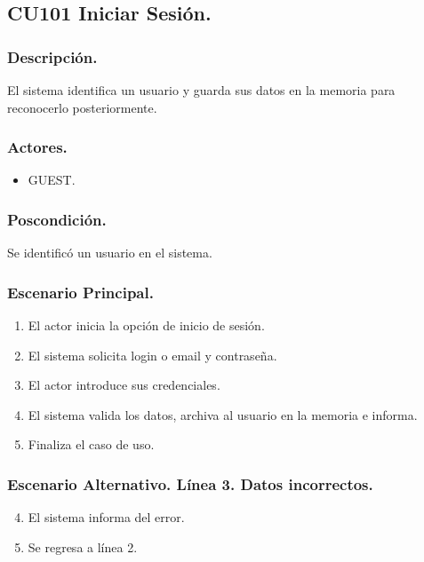 \subsection{CU101 Iniciar Sesi\'{o}n.}
\subsubsection{Descripci\'{o}n.}
El sistema identifica un usuario y guarda sus datos en la memoria para reconocerlo posteriormente.
\subsubsection{Actores.}
\begin{itemize}
\item GUEST.
\end{itemize}
\subsubsection{Poscondici\'{o}n.}
Se identific\'{o} un usuario en el sistema.
\subsubsection{Escenario Principal.}
\begin{enumerate}
\item El actor inicia la opci\'{o}n de inicio de sesi\'{o}n.
\item El sistema solicita login o email y contrase\~{n}a.
\item El actor introduce sus credenciales.
\item El sistema valida los datos, archiva al usuario en la memoria e informa.
\item Finaliza el caso de uso.
\end{enumerate}
\subsubsection{Escenario Alternativo. L\'{i}nea 3. Datos incorrectos.}
\begin{enumerate}
\setcounter{enumi}{3}
\item El sistema informa del error.
\item Se regresa a l\'{i}nea 2.
\end{enumerate}
